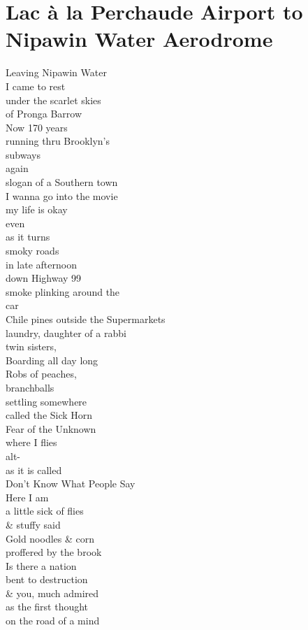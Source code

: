 \documentclass[smalldemyvopaper,11pt,twoside,onecolumn,openright,extrafontsizes]{memoir}
\begin{document}
\chapter{Lac à la Perchaude Airport to Nipawin Water Aerodrome}
Leaving Nipawin Water
\\I came to rest
\\under the scarlet skies
\\of Pronga Barrow
\\Now 170 years
\\running thru Brooklyn's
\\subways
\\again
\\slogan of a Southern town
\\I wanna go into the movie
\\my life is okay
\\even
\\as it turns
\\smoky roads
\\in late afternoon
\\down Highway 99
\\smoke plinking around the
\\car
\\Chile pines outside the Supermarkets
\\laundry, daughter of a rabbi
\\twin sisters,
\\Boarding all day long
\\Robs of peaches,
\\branchballs
\\settling somewhere
\\called the Sick Horn
\\Fear of the Unknown
\\where I flies
\\alt-
\\as it is called
\\Don't Know What People Say
\\Here I am
\\a little sick of flies
\\\& stuffy said
\\Gold noodles \& corn
\\proffered by the brook
\\Is there a nation
\\bent to destruction
\\\& you, much admired
\\as the first thought
\\on the road of a mind
\end{document}
